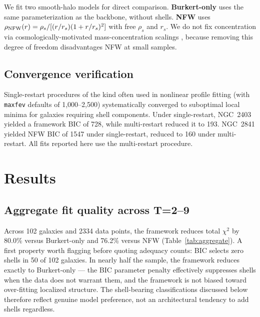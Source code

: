 We fit two smooth-halo models for direct comparison. \textbf{Burkert-only} uses the same parameterization as the backbone, without shells. \textbf{NFW} \citep{NFW1996,NFW1997} uses $\rho_{\rm NFW}(r) = \rho_s / [(r/r_s)(1 + r/r_s)^2]$ with free $\rho_s$ and $r_s$. We do not fix concentration via cosmologically-motivated mass-concentration scalings \citep[e.g.,][]{DuttonMaccio2014}, because removing this degree of freedom disadvantages NFW at small samples.

\subsection{Convergence verification}

Single-restart procedures of the kind often used in nonlinear profile fitting (with \texttt{maxfev} defaults of 1{,}000--2{,}500) systematically converged to suboptimal local minima for galaxies requiring shell components. Under single-restart, NGC~2403 yielded a framework BIC of 728, while multi-restart reduced it to 193. NGC~2841 yielded NFW BIC of 1547 under single-restart, reduced to 160 under multi-restart. All fits reported here use the multi-restart procedure.

\section{Results}
\label{sec:results}

\subsection{Aggregate fit quality across T=2--9}

Across 102 galaxies and 2334 data points, the framework reduces total $\chi^2$ by 80.0\% versus Burkert-only and 76.2\% versus NFW (Table~\ref{tab:aggregate}). A first property worth flagging before quoting adequacy counts: BIC selects zero shells in 50 of 102 galaxies. In nearly half the sample, the framework reduces exactly to Burkert-only --- the BIC parameter penalty effectively suppresses shells when the data does not warrant them, and the framework is not biased toward over-fitting localized structure. The shell-bearing classifications discussed below therefore reflect genuine model preference, not an architectural tendency to add shells regardless.

